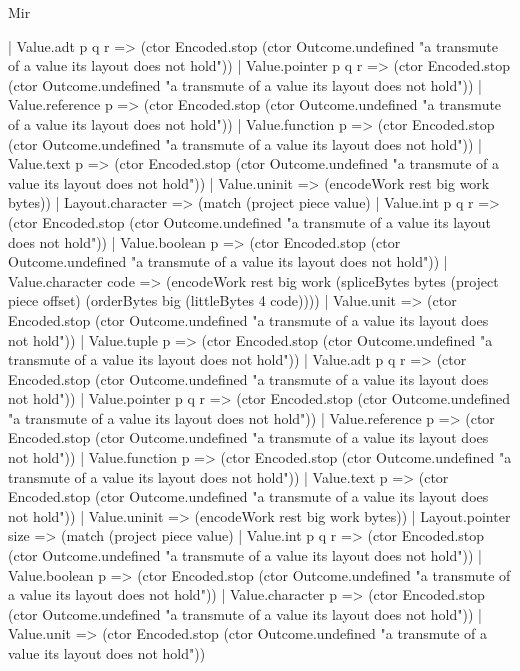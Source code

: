 \begin{lexlean}{Mir}
\begin{semanticmodule}
{          | Value.adt p q r => (ctor Encoded.stop (ctor Outcome.undefined "a transmute of a value its layout does not hold"))
          | Value.pointer p q r => (ctor Encoded.stop (ctor Outcome.undefined "a transmute of a value its layout does not hold"))
          | Value.reference p => (ctor Encoded.stop (ctor Outcome.undefined "a transmute of a value its layout does not hold"))
          | Value.function p => (ctor Encoded.stop (ctor Outcome.undefined "a transmute of a value its layout does not hold"))
          | Value.text p => (ctor Encoded.stop (ctor Outcome.undefined "a transmute of a value its layout does not hold"))
          | Value.uninit => (encodeWork rest big work bytes))
        | Layout.character => (match (project piece value)
          | Value.int p q r => (ctor Encoded.stop (ctor Outcome.undefined "a transmute of a value its layout does not hold"))
          | Value.boolean p => (ctor Encoded.stop (ctor Outcome.undefined "a transmute of a value its layout does not hold"))
          | Value.character code => (encodeWork rest big work (spliceBytes bytes (project piece offset) (orderBytes big (littleBytes 4 code))))
          | Value.unit => (ctor Encoded.stop (ctor Outcome.undefined "a transmute of a value its layout does not hold"))
          | Value.tuple p => (ctor Encoded.stop (ctor Outcome.undefined "a transmute of a value its layout does not hold"))
          | Value.adt p q r => (ctor Encoded.stop (ctor Outcome.undefined "a transmute of a value its layout does not hold"))
          | Value.pointer p q r => (ctor Encoded.stop (ctor Outcome.undefined "a transmute of a value its layout does not hold"))
          | Value.reference p => (ctor Encoded.stop (ctor Outcome.undefined "a transmute of a value its layout does not hold"))
          | Value.function p => (ctor Encoded.stop (ctor Outcome.undefined "a transmute of a value its layout does not hold"))
          | Value.text p => (ctor Encoded.stop (ctor Outcome.undefined "a transmute of a value its layout does not hold"))
          | Value.uninit => (encodeWork rest big work bytes))
        | Layout.pointer size => (match (project piece value)
          | Value.int p q r => (ctor Encoded.stop (ctor Outcome.undefined "a transmute of a value its layout does not hold"))
          | Value.boolean p => (ctor Encoded.stop (ctor Outcome.undefined "a transmute of a value its layout does not hold"))
          | Value.character p => (ctor Encoded.stop (ctor Outcome.undefined "a transmute of a value its layout does not hold"))
          | Value.unit => (ctor Encoded.stop (ctor Outcome.undefined "a transmute of a value its layout does not hold"))
}
\end{semanticmodule}
\end{lexlean}
